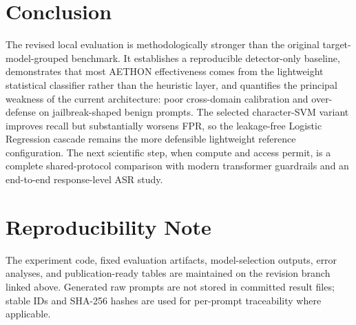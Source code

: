 \documentclass[11pt,a4paper]{article}
\begin{document}
\section{Conclusion}
The revised local evaluation is methodologically stronger than the original target-model-grouped benchmark. It establishes a reproducible detector-only baseline, demonstrates that most AETHON effectiveness comes from the lightweight statistical classifier rather than the heuristic layer, and quantifies the principal weakness of the current architecture: poor cross-domain calibration and over-defense on jailbreak-shaped benign prompts. The selected character-SVM variant improves recall but substantially worsens FPR, so the leakage-free Logistic Regression cascade remains the more defensible lightweight reference configuration. The next scientific step, when compute and access permit, is a complete shared-protocol comparison with modern transformer guardrails and an end-to-end response-level ASR study.

\section*{Reproducibility Note}
The experiment code, fixed evaluation artifacts, model-selection outputs, error analyses, and publication-ready tables are maintained on the revision branch linked above. Generated raw prompts are not stored in committed result files; stable IDs and SHA-256 hashes are used for per-prompt traceability where applicable.
\end{document}
